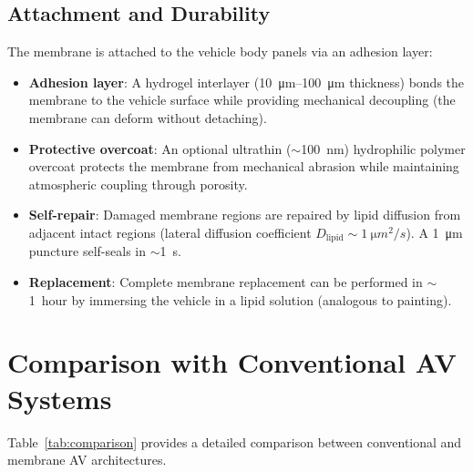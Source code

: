 \documentclass[twocolumn,10pt]{article}
\theoremstyle{definition}
\theoremstyle{remark}
\begin{document}
\subsection{Attachment and Durability}

The membrane is attached to the vehicle body panels via an adhesion layer:
\begin{itemize}
  \item \textbf{Adhesion layer}: A hydrogel interlayer (\SI{10}{\micro m}--\SI{100}{\micro m} thickness) bonds the membrane to the vehicle surface while providing mechanical decoupling (the membrane can deform without detaching).
  \item \textbf{Protective overcoat}: An optional ultrathin ($\sim$\SI{100}{nm}) hydrophilic polymer overcoat protects the membrane from mechanical abrasion while maintaining atmospheric coupling through porosity.
  \item \textbf{Self-repair}: Damaged membrane regions are repaired by lipid diffusion from adjacent intact regions (lateral diffusion coefficient $D_{\mathrm{lipid}} \sim \SI{1}{\micro m^2/s}$). A \SI{1}{\micro m} puncture self-seals in $\sim$\SI{1}{s}.
  \item \textbf{Replacement}: Complete membrane replacement can be performed in $\sim$\SI{1}{hour} by immersing the vehicle in a lipid solution (analogous to painting).
\end{itemize}


\section{Comparison with Conventional AV Systems}
\label{sec:comparison}

Table~\ref{tab:comparison} provides a detailed comparison between conventional and membrane AV architectures.
\end{document}
